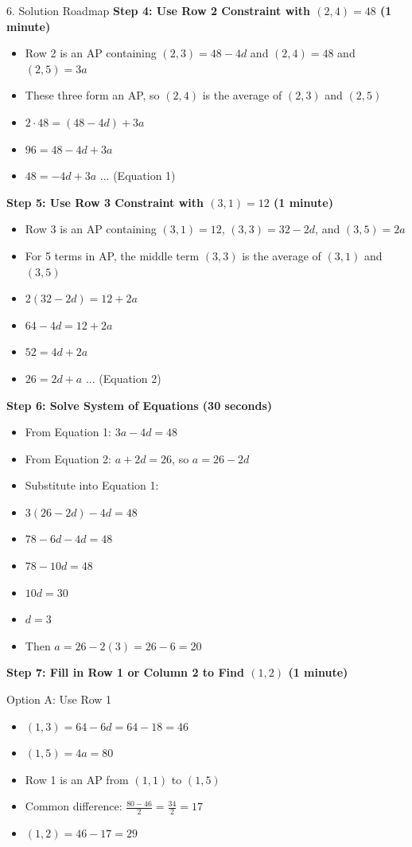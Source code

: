 \documentclass[12pt]{article}
\begin{document}
\begin{roadmapbox}{6. Solution Roadmap}
\textbf{Step 4: Use Row 2 Constraint with $(2,4) = 48$ (1 minute)}
\begin{itemize}
    \item Row 2 is an AP containing $(2,3) = 48 - 4d$ and $(2,4) = 48$ and $(2,5) = 3a$
    \item These three form an AP, so $(2,4)$ is the average of $(2,3)$ and $(2,5)$
    \item $2 \cdot 48 = (48 - 4d) + 3a$
    \item $96 = 48 - 4d + 3a$
    \item $48 = -4d + 3a$ ... (Equation 1)
\end{itemize}

\textbf{Step 5: Use Row 3 Constraint with $(3,1) = 12$ (1 minute)}
\begin{itemize}
    \item Row 3 is an AP containing $(3,1) = 12$, $(3,3) = 32 - 2d$, and $(3,5) = 2a$
    \item For 5 terms in AP, the middle term $(3,3)$ is the average of $(3,1)$ and $(3,5)$
    \item $2(32 - 2d) = 12 + 2a$
    \item $64 - 4d = 12 + 2a$
    \item $52 = 4d + 2a$
    \item $26 = 2d + a$ ... (Equation 2)
\end{itemize}

\textbf{Step 6: Solve System of Equations (30 seconds)}
\begin{itemize}
    \item From Equation 1: $3a - 4d = 48$
    \item From Equation 2: $a + 2d = 26$, so $a = 26 - 2d$
    \item Substitute into Equation 1:
    \item $3(26 - 2d) - 4d = 48$
    \item $78 - 6d - 4d = 48$
    \item $78 - 10d = 48$
    \item $10d = 30$
    \item $d = 3$
    \item Then $a = 26 - 2(3) = 26 - 6 = 20$
\end{itemize}

\textbf{Step 7: Fill in Row 1 or Column 2 to Find $(1,2)$ (1 minute)}

Option A: Use Row 1
\begin{itemize}
    \item $(1,3) = 64 - 6d = 64 - 18 = 46$
    \item $(1,5) = 4a = 80$
    \item Row 1 is an AP from $(1,1)$ to $(1,5)$
    \item Common difference: $\frac{80 - 46}{2} = \frac{34}{2} = 17$
    \item $(1,2) = 46 - 17 = 29$
\end{itemize}


\end{roadmapbox}
\end{document}
